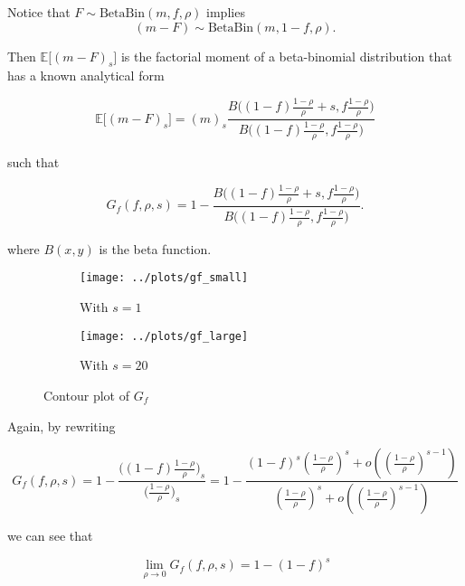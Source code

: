 \documentclass[american, abstract=on]{scrartcl}
\theoremstyle{plain}
\newcommand{\E}{\mathbb{E}}
\newcommand{\Beta}{\text{Beta}}
\newcommand{\Bin}{\text{Bin}}
\begin{document}
Notice that $F \sim \Beta\Bin(m, f, \rho)$ implies \begin{equation}(m - F) \sim \Beta\Bin(m, 1 - f, \rho).\end{equation}

Then $\E\big[(m - F)_s\big]$ is the factorial moment of a beta-binomial distribution that has a known analytical form

\begin{equation}
    \E\big[(m - F)_s\big] = (m)_s \frac{B\Big( (1 - f) \frac{1 - \rho}{\rho} + s, f \frac{1 - \rho}{\rho} \Big)}{B\Big( (1 - f) \frac{1 - \rho}{\rho}, f \frac{1 - \rho}{\rho} \Big)}
\end{equation}

such that

\begin{equation}
    G_f(f, \rho, s) = 1 - \frac{B\Big( (1 - f) \frac{1 - \rho}{\rho} + s, f \frac{1 - \rho}{\rho} \Big)}{B\Big( (1 - f) \frac{1 - \rho}{\rho}, f \frac{1 - \rho}{\rho} \Big)}.
\end{equation}

where $B(x, y)$ is the beta function.

\begin{figure}[H]
    \centering
    \begin{subfigure}{.5\textwidth}
      \centering
      \texttt{[image: ../plots/gf\_small]} 
      \caption{With $s = 1$}
      \label{fig:gf:small}  
    \end{subfigure}%
    \begin{subfigure}{.5\textwidth}
      \centering
      \texttt{[image: ../plots/gf\_large]}       
      \caption{With $s = 20$}
      \label{fig:gf:large}
    \end{subfigure}
    \caption{Contour plot of $G_f$}
    \label{fig:gf}
  \end{figure}

Again, by rewriting

\begin{equation}
    G_f(f, \rho, s) = 1 - \frac{\Big( (1-f) \frac{1 - \rho}{\rho} \Big)_s}{\Big( \frac{1 - \rho}{\rho} \Big)_s} = 1 - \frac{(1 - f)^s \left(\frac{1 - \rho}{\rho}\right)^s + o\left(\left(\frac{1 - \rho}{\rho}\right)^{s - 1} \right) }{\left(\frac{1 - \rho}{\rho}\right)^s + o\left(\left(\frac{1 - \rho}{\rho}\right)^{s - 1} \right)}
\end{equation}

we can see that

\begin{equation}
    \lim_{\rho \rightarrow 0} G_f(f, \rho, s) = 1 - (1 - f)^s
\end{equation}
\end{document}
